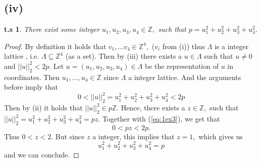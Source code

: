 \documentclass[10pt,a4paper]{article}
\newtheorem*{zz*}{t.s}
\newcommand{\ZZ}{\mathbb{Z}}
\begin{document}
\subsection*{(iv)}
	\begin{zz*}
		There exist some integer $u_1, u_2, u_3, u_4\in \ZZ,$ such that $p = u_1^2+ u_2^2 + u_3^2 + u_4^2.$
	\end{zz*}
\begin{proof}
	By definition it holds that $v_1, \dots v_4\in \mathbb{Z}^4,$ ($v_i$ from (i)) thus $\Lambda$ is a integer lattice , i.e. $\Lambda \subseteq \mathbb{Z}^4$ (as a set). Then by (iii) there exists a $u\in \Lambda$ such that $u\neq 0$ and $||u||_2^2 < 2p.$ Let $u = (u_1, u_2, u_3, u_4)\in \Lambda$ be the representation of $u$ in coordinates. Then $u_1, \dots ,u_4\in \mathbb{Z}$ since $\Lambda$ a integer lattice. And the arguments before imply that
	\begin{equation}
		0< ||u||_2^2 =  u_1^2 + u_2^2 + u_3^2 + u_4^2 < 2p
		\label{eq:1ex3}
	\end{equation}
	Then by (ii) it holds that $||u||_2^2\in p\mathbb{Z}.$ Hence, there exists a $z\in \mathbb{Z},$ such that
	$||u||_2^2 = u_1^2 + u_2^2 + u_3^2 + u_4^2 = pz.$ Together with (\ref{eq:1ex3}), we get that
	\[0< pz< 2p.\]
	Thus $0<z<2.$ But since $z$ a integer, this implies that $z = 1,$ which gives us
	\[u_1^2 + u_2^2 + u_3^2 + u_4^2 = p\]
	and we can conclude.
\end{proof}
	\pagebreak
	
	
\end{document}
